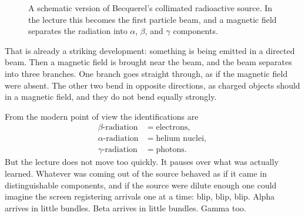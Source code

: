 \begin{figure}[h]
\centering
{}
\caption{A schematic version of Becquerel's collimated radioactive source. In the lecture this becomes the first particle beam, and a magnetic field separates the radiation into \(\alpha\), \(\beta\), and \(\gamma\) components.}
\end{figure}

That is already a striking development: something is being emitted in a directed beam. Then a magnetic field is brought near the beam, and the beam separates into three branches. One branch goes straight through, as if the magnetic field were absent. The other two bend in opposite directions, as charged objects should in a magnetic field, and they do not bend equally strongly.

From the modern point of view the identifications are
\begin{equation}
\begin{aligned}
\beta\text{-radiation}&=\text{electrons},\\
\alpha\text{-radiation}&=\text{helium nuclei},\\
\gamma\text{-radiation}&=\text{photons}.
\end{aligned}
\end{equation}
But the lecture does not move too quickly. It pauses over what was actually learned. Whatever was coming out of the source behaved as if it came in distinguishable components, and if the source were dilute enough one could imagine the screen registering arrivals one at a time: blip, blip, blip. Alpha arrives in little bundles. Beta arrives in little bundles. Gamma too.

